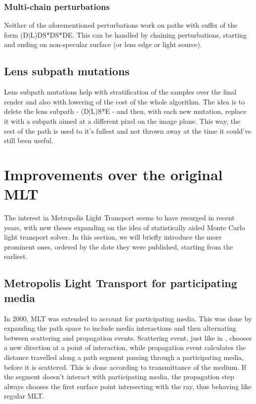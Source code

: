 \subsubsection{Multi-chain perturbations}

Neither of the aforementioned perturbations work on paths with suffix of the form (D$|$L)DS*DS*DE. This can be handled by chaining perturbations, starting and ending on non-specular surface (or lens edge or light source).

\subsection{Lens subpath mutations} 

Lens subpath mutations help with stratification of the samples over the final render and also with lowering of the cost of the whole algorithm. The idea is to delete the lens subpath - (D$|$L)S*E - and then, with each new mutation, replace it with a subpath aimed at a different pixel on the image plane. This way, the rest of the path is used to it's fullest and not thrown away at the time it could've still been useful.

\section{Improvements over the original MLT}

The interest in Metropolis Light Transport seems to have resurged in recent years, with new theses expanding on the idea of statistically aided Monte Carlo light transport solver. In this section, we will briefly introduce the more prominent ones, ordered by the date they were published, starting from the earliest.

\subsection{Metropolis Light Transport for participating media}

In 2000, MLT was extended to account for participating media. This was done by expanding the path space to include media interactions and then alternating between scattering and propagation events. Scattering event, just like in \cite{Veach:1997:MLT:258734.258775}, chooses a new direction at a point of interaction, while propagation event calculates the distance travelled along a path segment passing through a participating media, before it is scattered. This is done according to transmittance of the medium. If the segment doesn't interact with participating media, the propagation step always chooses the first surface point intersecting with the ray, thus behaving like regular MLT.

